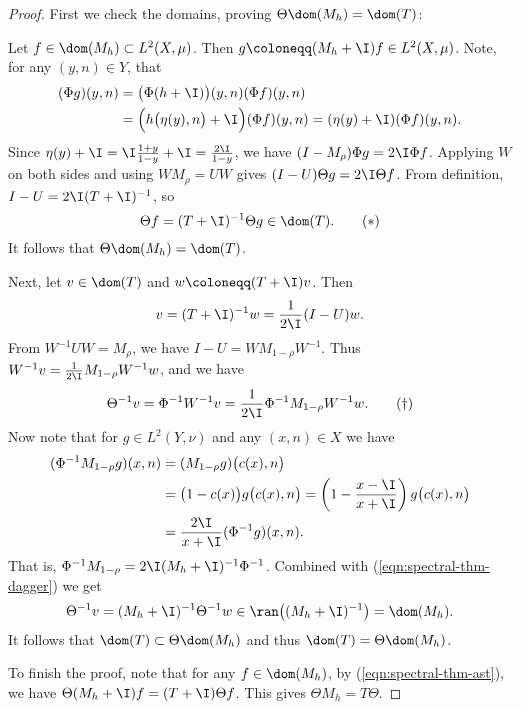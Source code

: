 \documentclass[oneside,reqno,letterpaper]{amsart}
\begin{document}
\begin{proof}
  \noindent
  First we check the domains, proving \(\Theta \dom(M_{h}) = \dom(T)\):
  
  Let \(f \in \dom(M_{h}) \subset L^2(X, \mu)\). 
  Then \(g \coloneqq (M_{h} + \I) f \in L^2(X, \mu)\). 
  Note, for any \((y, n) \in Y\), that 
  \begin{align*}
    (\Phi g) (y, n) 
    &= \big(\Phi (h + \I) \big)(y, n) (\Phi f)(y, n) \\ 
    &= \Big( h\big(\eta(y), n\big) + \I \Big) (\Phi f)(y, n) = (\eta(y) + \I) (\Phi f) (y, n) . 
  \end{align*}
  Since \(\eta(y) + \I = \I \frac{1 + y}{1 - y} + \I = \frac{2 \I}{1 - y}\), we have \((I - M_{\rho}) \Phi g = 2\I \Phi f\). 
  Applying \(W\) on both sides and using  \(WM_{\rho} = UW\) gives \((I - U) \Theta g = 2 \I \Theta f\). 
  From definition, \(I - U = 2 \I (T + \I)^{-1}\), so 
  \begin{equation}
  \label{eqn:spectral-thm-ast}
    \Theta f = (T + \I)^{-1} \Theta g \in \dom(T) . 
    \tag{\(\ast\)}
  \end{equation}
  It follows that \(\Theta \dom(M_{h}) = \dom(T)\). 

  Next, let \(v \in \dom(T)\) and \(w \coloneqq (T + \I) v\). Then \[
    v = (T + \I)^{-1} w = \frac{1}{2 \I} (I - U) w . 
  \] 
  From \(W^{-1} U W = M_{\rho}\), we have \(I - U = W M_{1 - \rho} W^{-1}\).
  Thus \(W^{-1} v = \frac{1}{2 \I} M_{1 - \rho} W^{-1} w\), and we have 
  \begin{equation}
  \label{eqn:spectral-thm-dagger}
    \Theta^{-1} v = \Phi^{-1} W^{-1} v = \frac{1}{2 \I} \Phi^{-1} M_{1 - \rho} W^{-1} w . 
    \tag{\(\dagger\)}
  \end{equation}
  Now note that for \(g \in L^2(Y, \nu)\) and any \((x, n) \in X\) we have
  \begin{align*}
    (\Phi^{-1} M_{1 - \rho} g)(x, n) 
    &= (M_{1 - \rho} g) \big(c(x), n\big) \\
    &= \big(1 - c(x)\big) g\big( c(x), n \big) 
      = \left( 1 - \frac{x - \I}{x + \I} \right) g\big( c(x), n \big) \\ 
    &= \frac{2\I}{x + \I} (\Phi^{-1} g) (x, n) . 
  \end{align*}
  That is, \(\Phi^{-1} M_{1 - \rho} = 2 \I (M_{h} + \I)^{-1} \Phi^{-1}\). Combined with (\ref{eqn:spectral-thm-dagger}) we get 
  \[
    \Theta^{-1} v = (M_{h} + \I)^{-1} \Theta^{-1} w \in \ran\big((M_{h} + \I)^{-1}\big) = \dom(M_{h}) . 
  \] 
  It follows that \(\dom(T) \subset \Theta \dom(M_{h})\) and thus \(\dom(T) = \Theta \dom(M_{h})\). 

  To finish the proof, note that for any \(f \in \dom(M_{h})\), by (\ref{eqn:spectral-thm-ast}), we have \(\Theta (M_{h} + \I) f = (T + \I) \Theta f\).
  This gives \(\Theta M_{h} = T \Theta\). 
\end{proof}
\end{document}
